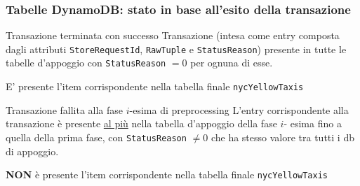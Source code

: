 \documentclass{beamer}
\begin{document}
\begin{frame}
    \frametitle{Tabelle DynamoDB: stato in base all'esito della transazione}

    \begin{exampleblock}{Transazione terminata con successo}
    Transazione (intesa come entry composta dagli attributi \texttt{StoreRequestId}, \texttt{RawTuple} e 
    \texttt{StatusReason}) presente in tutte le tabelle d'appoggio con \texttt{StatusReason} $= 0$ per ognuna di 
    esse.
    
    E' presente l'item corrispondente nella tabella finale \texttt{nycYellowTaxis}
    \end{exampleblock}

    \begin{alertblock}{Transazione fallita alla fase $i$-esima di preprocessing}
    L'entry corrispondente alla transazione è presente \underline{al più} nella tabella d'appoggio della fase $i$-
    esima fino a quella della prima fase, con \texttt{StatusReason} $\neq 0$ che ha stesso valore tra tutti i db di 
    appoggio.

    \textbf{NON} è presente l'item corrispondente nella tabella finale \texttt{nycYellowTaxis}
    \end{alertblock}
\end{frame}
\end{document}
